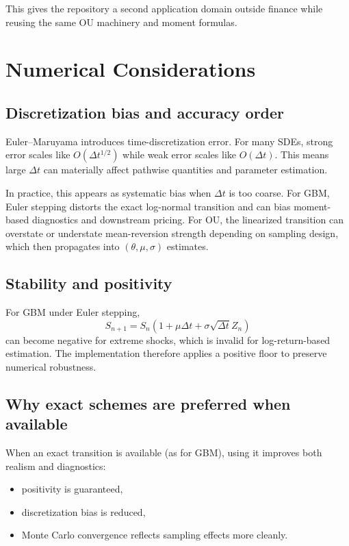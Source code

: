 \documentclass[11pt]{article}
\begin{document}
This gives the repository a second application domain outside finance while reusing the same OU machinery and moment formulas.

\section{Numerical Considerations}

\subsection{Discretization bias and accuracy order}

Euler--Maruyama introduces time-discretization error. For many SDEs, strong error scales like $O(\Delta t^{1/2})$ while weak error scales like $O(\Delta t)$. This means large $\Delta t$ can materially affect pathwise quantities and parameter estimation.

In practice, this appears as systematic bias when $\Delta t$ is too coarse. For GBM, Euler stepping distorts the exact log-normal transition and can bias moment-based diagnostics and downstream pricing. For OU, the linearized transition can overstate or understate mean-reversion strength depending on sampling design, which then propagates into $(\theta,\mu,\sigma)$ estimates.

\subsection{Stability and positivity}

For GBM under Euler stepping,
\begin{equation}
  S_{n+1} = S_n\left(1+\mu\Delta t+\sigma\sqrt{\Delta t}Z_n\right)
\end{equation}
can become negative for extreme shocks, which is invalid for log-return-based estimation. The implementation therefore applies a positive floor to preserve numerical robustness.

\subsection{Why exact schemes are preferred when available}

When an exact transition is available (as for GBM), using it improves both realism and diagnostics:
\begin{itemize}[leftmargin=1.2em]
  \item positivity is guaranteed,
  \item discretization bias is reduced,
  \item Monte Carlo convergence reflects sampling effects more cleanly.
\end{itemize}
\end{document}
